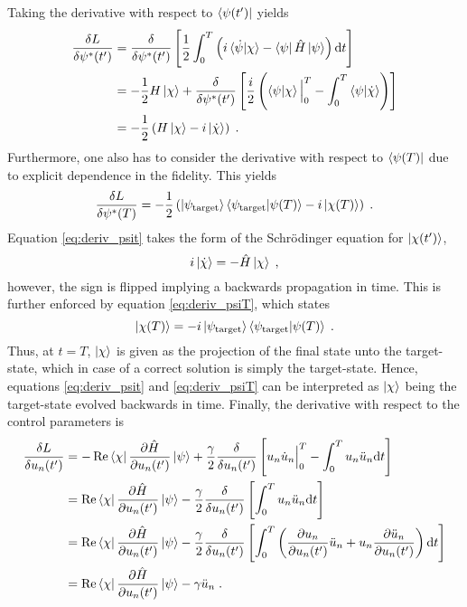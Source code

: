 Taking the derivative with respect to $\bra{\psi (t')}$ yields
\begin{align}
	\frac{\delta L}{\delta \psi ^* (t')} &= \frac{\delta }{\delta \psi ^* (t')} \left[ \frac{1}{2} \int_{0}^{T} \left( i \braket{\dot{\psi} | \chi} -  \bra{\psi} \hat{H} \ket{\psi} \right) \mathrm{d}t \right] \nonumber \\ 
	&= - \frac{1}{2} H \ket{\chi} + \frac{\delta }{\delta \psi ^* (t')} \left[ \frac{i}{2} \left( \braket{\psi | \chi} \Big|_0^T - \int_0^T \braket{\psi | \dot{\chi}} \right) \right] \nonumber \\
	&= - \frac{1}{2} \left( H \ket{\chi} -i \ket{\dot{\chi}}  \right) \; . \label{eq:deriv_psit}
\end{align}
Furthermore, one also has to consider the derivative with respect to $\bra{\psi (T)}$ due to explicit dependence in the fidelity. This yields
\begin{equation}
	\frac{\delta L}{\delta \psi ^* (T)} = - \frac{1}{2} \left( \ket{\psi_{\mathrm{target}}} \braket{\psi_{\mathrm{target}} | \psi (T)} - i \ket{\chi (T)} \right) \; . \label{eq:deriv_psiT}
\end{equation}
Equation \ref{eq:deriv_psit} takes the form of the Schrödinger equation for $\ket{\chi (t')}$,
\begin{equation}
	 i \ket{\dot{\chi}} =  - \hat{H} \ket{\chi} \; ,
\end{equation}
however, the sign is flipped implying a backwards propagation in time. This is further enforced by equation \ref{eq:deriv_psiT}, which states
\begin{equation}
	 \ket{\chi (T)} = -i \ket{\psi_{\mathrm{target}}} \braket{\psi_{\mathrm{target}} | \psi (T)} \; .
\end{equation}
Thus, at $t = T$, $\ket{\chi}$ is given as the projection of the final state unto the target-state, which in case of a correct solution is simply the target-state. Hence, equations \ref{eq:deriv_psit} and \ref{eq:deriv_psiT} can be interpreted as $\ket{\chi}$ being the target-state evolved backwards in time.
Finally, the derivative with respect to the control parameters is 
\begin{align}
	\frac{\delta L}{\delta u_n (t')} &= - \Re \bra{\chi} \pdv{\hat{H}}{u_n (t')} \ket{\psi} + \frac{\gamma}{2} \frac{\delta }{\delta u_n (t')} \left[ u_n \dot{u}_n \Big|_0^T - \int_0^T u_n \ddot{u}_n \mathrm{d}t \right] \nonumber \\
	&=  \Re \bra{\chi} \pdv{\hat{H}}{u_n (t')} \ket{\psi} - \frac{\gamma}{2} \frac{\delta }{\delta u_n (t')} \left[ \int_0^T u_n \ddot{u}_n \mathrm{d}t \right] \nonumber \\
	&=  \Re \bra{\chi} \pdv{\hat{H}}{u_n (t')} \ket{\psi} - \frac{\gamma}{2} \frac{\delta }{\delta u_n (t')} \left[ \int_0^T \left( \pdv{u_n}{u_n (t')} \ddot{u}_n + u_n \pdv{\ddot{u}_n}{u_n (t')} \right) \mathrm{d}t \right] \nonumber \\
	&= \Re \bra{\chi} \pdv{\hat{H}}{u_n (t')} \ket{\psi} - \gamma \ddot{u}_n \; . \label{eq:deriv_u} 
\end{align} 
